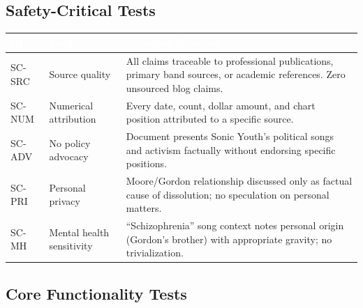 \documentclass[11pt,letterpaper]{article}
\newcommand{\tableheader}[1]{\textbf{\sffamily\textcolor{white}{#1}}}
\begin{document}
\subsection{Safety-Critical Tests}

\begin{center}
\begin{tabularx}{\textwidth}{C{1.2cm}L{3.5cm}X}
\toprule
{}
\tableheader{ID} & \tableheader{Verifies} & \tableheader{Expected Behavior} \\
\midrule
SC-SRC & Source quality & All claims traceable to professional publications, primary band sources, or academic references. Zero unsourced blog claims. \\
SC-NUM & Numerical attribution & Every date, count, dollar amount, and chart position attributed to a specific source. \\
SC-ADV & No policy advocacy & Document presents Sonic Youth's political songs and activism factually without endorsing specific positions. \\
SC-PRI & Personal privacy & Moore/Gordon relationship discussed only as factual cause of dissolution; no speculation on personal matters. \\
SC-MH & Mental health sensitivity & ``Schizophrenia'' song context notes personal origin (Gordon's brother) with appropriate gravity; no trivialization. \\
\bottomrule
\end{tabularx}
\end{center}

\subsection{Core Functionality Tests}
\end{document}

